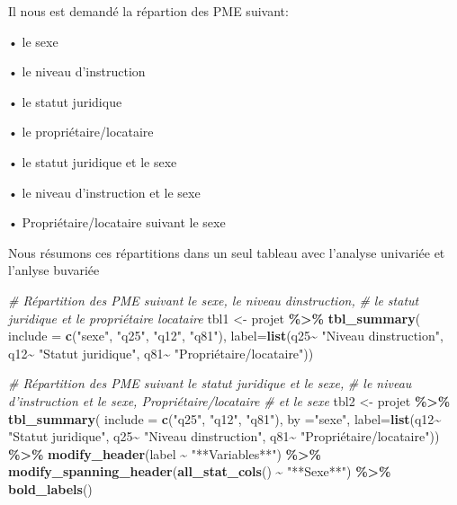 \documentclass[
]{article}
\newenvironment{Shaded}{\begin{snugshade}}{\end{snugshade}}
\newcommand{\AttributeTok}[1]{\textcolor[rgb]{0.13,0.29,0.53}{#1}}
\newcommand{\CommentTok}[1]{\textcolor[rgb]{0.56,0.35,0.01}{\textit{#1}}}
\newcommand{\FunctionTok}[1]{\textcolor[rgb]{0.13,0.29,0.53}{\textbf{#1}}}
\newcommand{\NormalTok}[1]{#1}
\newcommand{\OtherTok}[1]{\textcolor[rgb]{0.56,0.35,0.01}{#1}}
\newcommand{\SpecialCharTok}[1]{\textcolor[rgb]{0.81,0.36,0.00}{\textbf{#1}}}
\newcommand{\StringTok}[1]{\textcolor[rgb]{0.31,0.60,0.02}{#1}}
\begin{document}
Il nous est demandé la répartion des PME suivant:

• le sexe

• le niveau d'instruction

• le statut juridique

• le propriétaire/locataire

• le statut juridique et le sexe

• le niveau d'instruction et le sexe

• Propriétaire/locataire suivant le sexe

Nous résumons ces répartitions dans un seul tableau avec l'analyse
univariée et l'anlyse buvariée

\begin{Shaded}
\begin{Highlighting}[]
\CommentTok{\# Répartition des PME suivant le sexe, le niveau d\textquotesingle{}instruction,}
\CommentTok{\# le statut juridique et le propriétaire locataire}
\NormalTok{tbl1 }\OtherTok{\textless{}{-}}\NormalTok{ projet }\SpecialCharTok{\%\textgreater{}\%} \FunctionTok{tbl\_summary}\NormalTok{(}
  \AttributeTok{include =} \FunctionTok{c}\NormalTok{(}\StringTok{"sexe"}\NormalTok{, }\StringTok{"q25"}\NormalTok{, }\StringTok{"q12"}\NormalTok{, }\StringTok{"q81"}\NormalTok{),}
  \AttributeTok{label=}\FunctionTok{list}\NormalTok{(q25}\SpecialCharTok{\textasciitilde{}} \StringTok{"Niveau d\textquotesingle{}instruction"}\NormalTok{, }
\NormalTok{             q12}\SpecialCharTok{\textasciitilde{}} \StringTok{"Statut juridique"}\NormalTok{,}
\NormalTok{             q81}\SpecialCharTok{\textasciitilde{}} \StringTok{"Propriétaire/locataire"}\NormalTok{))}

\CommentTok{\# Répartition des PME suivant le statut juridique et le sexe,}
\CommentTok{\# le niveau d’instruction et le sexe,   Propriétaire/locataire}
\CommentTok{\# et le sexe}
\NormalTok{tbl2 }\OtherTok{\textless{}{-}}\NormalTok{ projet }\SpecialCharTok{\%\textgreater{}\%} \FunctionTok{tbl\_summary}\NormalTok{(}
  \AttributeTok{include =} \FunctionTok{c}\NormalTok{(}\StringTok{"q25"}\NormalTok{, }\StringTok{"q12"}\NormalTok{, }\StringTok{"q81"}\NormalTok{), }
  \AttributeTok{by =}\StringTok{"sexe"}\NormalTok{, }\AttributeTok{label=}\FunctionTok{list}\NormalTok{(q12}\SpecialCharTok{\textasciitilde{}} \StringTok{"Statut juridique"}\NormalTok{, }
\NormalTok{                         q25}\SpecialCharTok{\textasciitilde{}} \StringTok{"Niveau d\textquotesingle{}instruction"}\NormalTok{, }
\NormalTok{                         q81}\SpecialCharTok{\textasciitilde{}} \StringTok{"Propriétaire/locataire"}\NormalTok{)) }\SpecialCharTok{\%\textgreater{}\%} 
  \FunctionTok{modify\_header}\NormalTok{(label }\SpecialCharTok{\textasciitilde{}} \StringTok{"**Variables**"}\NormalTok{) }\SpecialCharTok{\%\textgreater{}\%}
  \FunctionTok{modify\_spanning\_header}\NormalTok{(}\FunctionTok{all\_stat\_cols}\NormalTok{() }\SpecialCharTok{\textasciitilde{}} \StringTok{"**Sexe**"}\NormalTok{) }\SpecialCharTok{\%\textgreater{}\%}
  \FunctionTok{bold\_labels}\NormalTok{()}


\end{Highlighting}
\end{Shaded}
\end{document}
